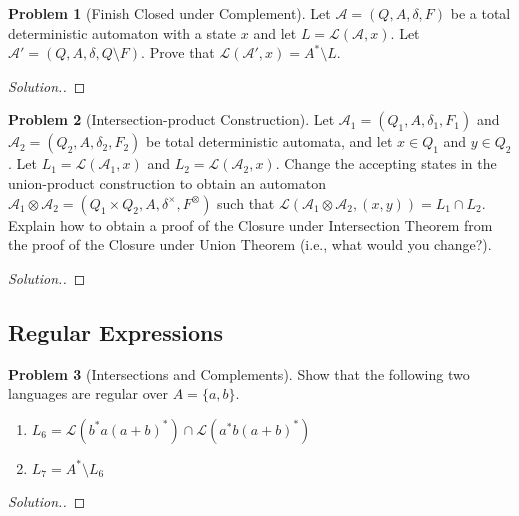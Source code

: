 \documentclass[11pt]{article}
\theoremstyle{theorem} %
\theoremstyle{definition} %
\newtheorem{problem}                    {{\color{BurntOrange}Problem}}
\theoremstyle{remark} %
\begin{document}
\begin{problem}
    [Finish Closed under Complement]
    Let \(\mathcal A = (Q, A, \delta, F)\) be a total deterministic automaton with a state \(x\) and let \(L = \mathcal L(\mathcal A, x)\).
    Let \(\mathcal A' = (Q, A, \delta, Q\setminus F)\).
    Prove that \(\mathcal L(\mathcal A', x) = A^* \setminus L\).
\end{problem}

\begin{proof}[Solution.]
    
\end{proof}

\begin{problem}
    [Intersection-product Construction]
    Let \(\mathcal A_1 = (Q_1, A, \delta_1, F_1)\) and \(\mathcal A_2 = (Q_2, A, \delta_2, F_2)\) be total deterministic automata, and let \(x \in Q_1\) and \(y \in Q_2\).
    Let \(L_1 = \mathcal L(\mathcal A_1, x)\) and \(L_2 = \mathcal L(\mathcal A_2, x)\).
    Change the accepting states in the union-product construction to obtain an automaton \(\mathcal A_1 \otimes \mathcal A_2 = (Q_1 \times Q_2, A, \delta^\times, F^
    \otimes)\) such that \(\mathcal L(\mathcal A_1 \otimes \mathcal A_2, (x, y)) = L_1 \cap L_2\).
    Explain how to obtain a proof of the Closure under Intersection Theorem from the proof of the Closure under Union Theorem (i.e., what would you change?).
\end{problem}

\begin{proof}[Solution.]
    
\end{proof}

\subsection*{Regular Expressions}

\begin{problem}
    [Intersections and Complements]
    Show that the following two languages are regular over \(A = \{a, b\}\). 
    \begin{enumerate}
        \item \(L_6 = \mathcal L(b^*a(a + b)^*) \cap \mathcal L(a^*b(a + b)^*)\)
        \item \(L_7 = A^* \setminus L_6\)
    \end{enumerate}
\end{problem}

\begin{proof}[Solution.]
    
\end{proof}
\end{document}
